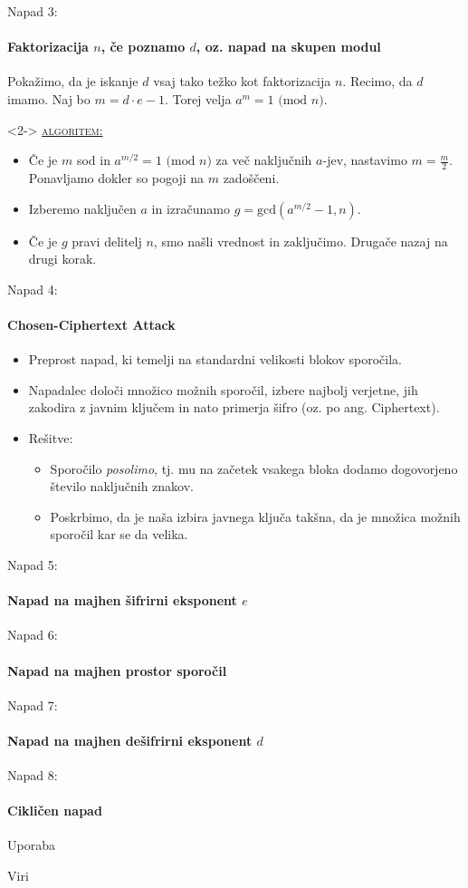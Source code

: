 \documentclass[a4paper, 12pt]{beamer} %
\newenvironment{matematika}[1]{
\textcolor{bostonuniversityred}{\underline{\textsc{#1:}}}
}{
}
\begin{document}
\begin{frame}{Napad 3:}
\framesubtitle{Faktorizacija $n$, če poznamo $d$, oz. napad na skupen modul}
Pokažimo, da je iskanje $d$ vsaj tako težko kot faktorizacija $n$. Recimo, da $d$ imamo. Naj bo $m = d \cdot e - 1$. Torej velja $a^m = 1 \text{ (mod }n)$.
\begin{block}<2->{}
\begin{matematika}{algoritem}
\begin{itemize}[label=]
\item<2->  Če je $m$ sod in $a^{m/2} = 1 \text{ (mod }n)$ za več naključnih $a$-jev, nastavimo $m = \frac{m}{2}$. Ponavljamo dokler so pogoji na $m$ zadoščeni.
\item<3-> Izberemo naključen $a$ in izračunamo $g = \text{gcd}(a^{m/2} -1, n)$.
\item<4-> Če je $g$ pravi delitelj $n$, smo našli vrednost in zaključimo. Drugače nazaj na drugi korak.
\end{itemize}
\end{matematika}
\end{block}
\end{frame}

\begin{frame}{Napad 4:}
\framesubtitle{Chosen-Ciphertext Attack}
\begin{itemize}[label=]
\item<1-> Preprost napad, ki temelji na standardni velikosti blokov sporočila.
\item<2-> Napadalec določi množico možnih sporočil, izbere najbolj verjetne, jih zakodira z javnim ključem in nato primerja šifro (oz. po ang. Ciphertext).
\item <3->
Rešitve:
\begin{itemize}[label=]
\item<4-> Sporočilo \emph{posolimo}, tj. mu na začetek vsakega bloka dodamo dogovorjeno število naključnih znakov.
\item<5-> Poskrbimo, da je naša izbira javnega ključa takšna, da je množica možnih sporočil kar se da velika.
\end{itemize}
\end{itemize}
\end{frame}

\begin{frame}{Napad 5:}
 \framesubtitle{Napad na majhen šifrirni eksponent $e$}
\end{frame}

\begin{frame}{Napad 6:}
\framesubtitle{Napad na majhen prostor sporočil}
\end{frame}

\begin{frame}{Napad 7:}
\framesubtitle{Napad na majhen dešifrirni eksponent $d$}
\end{frame}

\begin{frame}{Napad 8:}
\framesubtitle{Cikličen napad}
\end{frame}

\begin{frame}{Uporaba}
\end{frame}

\begin{frame}{Viri}
\end{frame}
\end{document}

